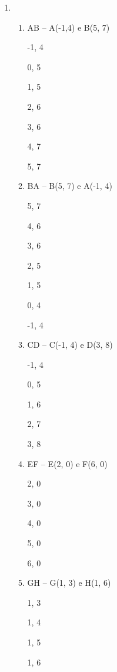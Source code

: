 \begin{enumerate}
        \item \begin{enumerate}[label=\alph*.]
				   \setlength\itemsep{1em}
					\item	 AB – A(-1,4) e B(5, 7)
					   				
                       -1, 4
                       
                        0, 5
                        
                        1, 5
                        
                       2, 6
                       
                       3, 6
                       
                       4, 7
                       
                        5, 7
					
					\item    BA – B(5, 7) e A(-1, 4)
					
                           5, 7
                           
                          4, 6
                          
                          3, 6
                          
                          2, 5
                          
                          1, 5
                          
                         0, 4
                         
                         -1, 4
									
					\item  CD – C(-1, 4) e D(3, 8)
					
						 -1, 4
						 
						 0, 5
						  
						 1, 6
						  
						 2, 7
						  
						 3, 8
									
					\item EF – E(2, 0) e F(6, 0)
					
						2, 0
						
						3, 0
						
						4, 0
						
						5, 0
						
						6, 0
									
					\item   GH – G(1, 3) e H(1, 6)
									
                      1, 3
                      
                      1, 4
                      
                      1, 5
                      
                      1, 6
									
				\end{enumerate}
	\end{enumerate}